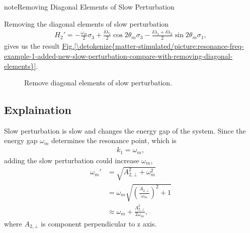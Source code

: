 \documentclass[letterpaper,12pt,english]{sphinxmanual}
\begin{document}
\begin{sphinxadmonition}{note}{Removing Diagonal Elements of Slow Perturbation}

Removing the diagonal elements of slow perturbation
\begin{equation*}
\begin{split}H_2' = -\frac{\omega_m}{2} \sigma_3 + \frac{\delta \lambda_1 }{2} \cos 2\theta_m \sigma_3 - \frac{\delta \lambda_1 + \delta \lambda_2}{2} \sin 2\theta_m \sigma_1,\end{split}
\end{equation*}
gives us the result \hyperref[\detokenize{matter-stimulated/picture:resonance-freq-example-1-added-new-slow-perturbation-compare-with-removing-diagonal-elements}]{Fig.\@ \ref{\detokenize{matter-stimulated/picture:resonance-freq-example-1-added-new-slow-perturbation-compare-with-removing-diagonal-elements}}}.
\begin{figure}[htbp]
\centering
\capstart

\noindent{}
\caption{Remove diagonal elements of slow perturbation.}\label{\detokenize{matter-stimulated/picture:resonance-freq-example-1-added-new-slow-perturbation-compare-with-removing-diagonal-elements}}\label{\detokenize{matter-stimulated/picture:id7}}\end{figure}
\end{sphinxadmonition}


\subsection{Explaination}
\label{\detokenize{matter-stimulated/picture:explaination}}
Slow perturbation is slow and changes the energy gap of the system. Since the energy gap \(\omega_m\) determines the resonance point, which is
\begin{equation*}
\begin{split}k_1 = \omega_m,\end{split}
\end{equation*}
adding the slow perturbation could increase \(\omega_m\),
\label{\detokenize{matter-stimulated/picture:equation-quadratic-approximation-energy-gap-shift}}\begin{equation}\label{equation:matter-stimulated/picture:quadratic-approximation-energy-gap-shift}
\begin{split}\omega_m' &= \sqrt{A_{2,\bot} ^2 + \omega_m^2} \\
& = \omega_m \sqrt{ \left(\frac{A_{2,\bot}}{\omega_m} \right)^2 + 1 } \\
& \approx  \omega_m + \frac{A_{2,\bot}^2}{2\omega_m},\end{split}
\end{equation}
where \(A_{2,\bot}\) is component perpendicular to z axis.
\end{document}
